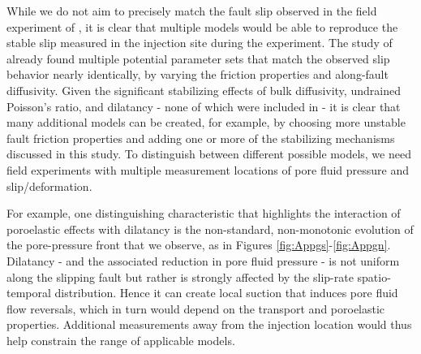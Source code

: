 \documentclass[draft]{agujournal2019}
\begin{document}
While we do not aim to precisely match the fault slip observed in the field experiment of , it is clear that multiple models would be able to reproduce the stable slip measured in the injection site during the experiment.  The study of  already found multiple potential parameter sets that match the observed slip behavior nearly identically, by varying the friction properties and along-fault diffusivity. Given the significant stabilizing effects of bulk diffusivity, undrained Poisson's ratio, and dilatancy - none of which were included in  - it is clear that many additional models can be created, for example, by choosing more unstable fault friction properties and adding one or more of the stabilizing mechanisms discussed in this study. To distinguish between different possible models, we need field experiments with multiple measurement locations of pore fluid pressure and slip/deformation.

For example, one distinguishing characteristic that highlights the interaction of poroelastic effects with dilatancy is the non-standard, non-monotonic evolution of the pore-pressure front that we observe, as in Figures \ref{fig:Appgs}-\ref{fig:Appgn}.  Dilatancy - and the associated reduction in pore fluid pressure - is not uniform along the slipping fault but rather is strongly affected by the slip-rate spatio-temporal distribution.  Hence it can create local suction that induces pore fluid flow reversals, which in turn would depend on the transport and poroelastic properties. Additional measurements away from the injection location would thus help constrain the range of applicable models.
\end{document}
